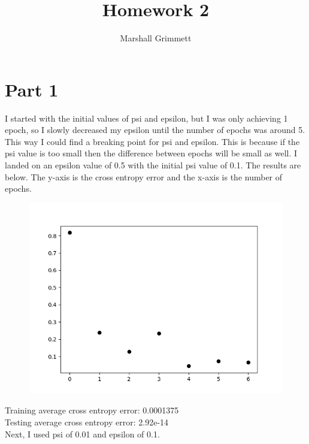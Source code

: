 \documentclass{article}
\title{Homework 2}
\author{Marshall Grimmett}
\begin{document}
\maketitle


\section{Part 1}
I started with the initial values of psi and epsilon, but I was only
achieving 1 epoch, so I slowly decreased my epsilon until the number of epochs
was around 5. This way I could find a breaking point for psi and epsilon.
This is because if the psi value is too small then the difference between
epochs will be small as well. I landed on an epsilon value of 0.5 with
the initial psi value of 0.1. The results are below. The y-axis is the
cross entropy error and the x-axis is the number of epochs.

\begin{figure}[h!]
  \includegraphics[width=\linewidth]{psi_0.1_epsilon_0.5.png}
\end{figure}

Training average cross entropy error: 0.0001375 \\
Testing average cross entropy error: 2.92e-14 \\

Next, I used psi of 0.01 and epsilon of 0.1.
\end{document}
